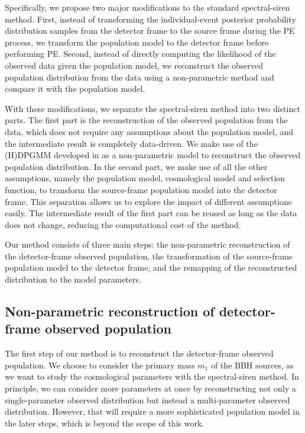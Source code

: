 \documentclass[sn-aps, pdflatex, iicol]{sn-jnl}
\begin{document}
Specifically, we propose two major modifications to the standard spectral-siren method.
First, instead of transforming the individual-event posterior probability distribution samples from the detector frame to the source frame during the \ac{PE} process, we transform the population model to the detector frame before performing \ac{PE}.
Second, instead of directly computing the likelihood of the observed data given the population model, we reconstruct the observed population distribution from the data using a non-parametric method and compare it with the population model.

With these modifications, we separate the spectral-siren method into two distinct parts.
The first part is the reconstruction of the observed population from the data, which does not require any assumptions about the population model, and the intermediate result is completely data-driven.
We make use of the \ac{(H)DPGMM} developed in \cite{Rinaldi:2021bhm} as a non-parametric model to reconstruct the observed population distribution.
In the second part, we make use of all the other assumptions, namely the population model, cosmological model and selection function, to transform the source-frame population model into the detector frame.
This separation allows us to explore the impact of different assumptions easily.
The intermediate result of the first part can be reused as long as the data does not change, reducing the computational cost of the method.

Our method consists of three main steps: the non-parametric reconstruction of the detector-frame observed population, the transformation of the source-frame population model to the detector frame, and the remapping of the reconstructed distribution to the model parameters.

\subsection{Non-parametric reconstruction of detector-frame observed population}
\label{sec:reconstruction}

The first step of our method is to reconstruct the detector-frame observed population.
We choose to consider the primary mass $m_1$ of the \ac{BBH} sources, as we want to study the cosmological parameters with the spectral-siren method.
In principle, we can consider more parameters at once by reconstructing not only a single-parameter observed distribution but instead a multi-parameter observed distribution.
However, that will require a more sophisticated population model in the later steps, which is beyond the scope of this work.
\end{document}
